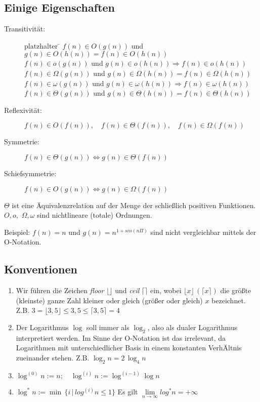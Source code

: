 \documentclass{scrreprt}%
\theoremstyle{break}
\begin{document}
\subsection{Einige Eigenschaften}
\begin{description}
\item[Transitivität:]
\begin{tabbing}
platzhalter \= \kill
        \> $f(n) \in O(g(n))$ und $g(n) \in O(h(n))=f(n) \in O(h(n))$\\
        \> $f(n) \in o(g(n))$ und $g(n) \in o(h(n)) \Rightarrow f(n) \in o(h(n))$\\
        \> $f(n) \in \Omega(g(n))$ und $g(n) \in \Omega(h(n))=f(n) \in \Omega(h(n))$\\
        \> $f(n) \in \omega(g(n))$ und $g(n) \in \omega(h(n)) \Rightarrow f(n) \in \omega(h(n))$\\
        \> $f(n) \in \Theta(g(n))$ und $g(n) \in \Theta(h(n))=f(n) \in \Theta(h(n))$
\end{tabbing}
\item[Reflexivität:]
        $f(n) \in O(f(n)), \quad f(n) \in \Theta(f(n)), \quad f(n) \in \Omega(f(n))$
\item[Symmetrie:]
        $f(n) \in \Theta(g(n)) \Leftrightarrow g(n) \in \Theta(f(n))$
\item[Schiefsymmetrie:]
        $f(n) \in O(g(n)) \Leftrightarrow g(n) \in \Omega(f(n))$
\end{description}
$\Theta$ ist eine Äquivalenzrelation auf der Menge der schließlich positiven Funktionen.
$O,o,$ $\Omega,\omega$ sind nichtlineare (totale) Ordnungen.

Beispiel: $f(n)=n$ und $g(n)=n^{1+sin(n\Pi)}$ sind nicht vergleichbar mittels der O-Notation.

\subsection{Konventionen}
\begin{enumerate}
\item   Wir führen die Zeichen \emph{floor} $ \lfloor \rfloor$ und \emph{ceil} $\lceil \rceil$ ein,
        wobei $\lfloor x \rfloor \, ( \lceil x \rceil)$ die größte (kleinste) ganze Zahl kleiner oder gleich
        (größer oder gleich) $x$ bezeichnet. Z.B. $3=\lfloor 3,5\rfloor \leq 3,5 \leq \lceil 3,5 \rceil=4$
\item   Der Logarithmus $\log$ soll immer als $\log_2$, also als dualer Logarithmus interpretiert werden. Im Sinne der O-Notation ist das
irrelevant, da Logarithmen mit unterschiedlicher Basis in einem konstanten VerhÄltnis zueinander stehen. Z.B. $\log_2 n = 2 \, \log_4 n$
\item   $\log^{(0)}n := n; \quad \log^{(i)}n := \log^{(i-1)}\log n$
\item   $\log^{*}n := \min \, \{i \, | \, log^{(i)}n \leq1 \}$ Es gilt $ \lim\limits_{n \rightarrow \infty}{log^{*}n} = + \infty$
\end{enumerate}
\end{document}
